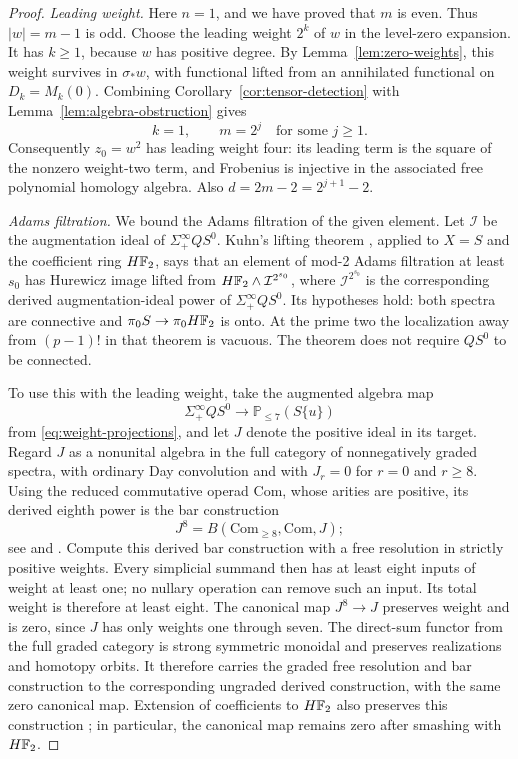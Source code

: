 \begin{proof}
\emph{Leading weight.}
Here \(n=1\), and we have proved that \(m\) is even. Thus
\(|w|=m-1\) is odd. Choose the leading weight \(2^k\) of \(w\)
in the level-zero expansion. It has \(k\ge1\), because \(w\) has
positive degree. By Lemma~\ref{lem:zero-weights}, this weight survives
in \(\sigma_*w\), with functional lifted from an annihilated
functional on \(D_k=M_k(0)\). Combining
Corollary~\ref{cor:tensor-detection} with
Lemma~\ref{lem:algebra-obstruction} gives
\[
k=1,\qquad m=2^j\quad\text{for some }j\ge1.
\]
Consequently \(z_0=w^2\) has leading weight four: its leading term
is the square of the nonzero weight-two term, and Frobenius is
injective in the associated free polynomial homology algebra. Also
\(d=2m-2=2^{j+1}-2\).

\emph{Adams filtration.}
We bound the Adams filtration of the given element.
Let \(\mathcal I\) be the augmentation ideal of
\(\Sigma^\infty_+QS^0\). Kuhn's lifting theorem
\cite[Theorems~1.2--1.3]{Kuhn2018}, applied to
\(X=S\) and the coefficient ring \(H\mathbb F_2\), says that an element
of mod-2 Adams filtration at least \(s_0\) has Hurewicz image lifted
from \(H\mathbb F_2\wedge\mathcal I^{2^{s_0}}\), where
\(\mathcal I^{2^{s_0}}\) is the corresponding derived augmentation-ideal power of
\(\Sigma^\infty_+QS^0\). Its hypotheses hold: both spectra are
connective and \(\pi_0S\to\pi_0H\mathbb F_2\) is onto. At the prime two
the localization away from \((p-1)!\) in that theorem is vacuous.
The theorem does not require \(QS^0\) to be connected.

To use this with the leading weight, take the augmented algebra map
\[
\Sigma^\infty_+QS^0\longrightarrow\mathbb P_{\le7}(S\{u\})
\]
from \eqref{eq:weight-projections}, and let \(J\) denote the
positive ideal in its target. Regard \(J\) as a nonunital algebra
in the full category of nonnegatively graded spectra, with ordinary
Day convolution and with \(J_r=0\) for \(r=0\) and \(r\ge8\).
Using the reduced commutative operad \(\mathrm{Com}\), whose arities
are positive, its derived eighth power is the bar construction
\[
J^8=B(\mathrm{Com}_{\ge8},\mathrm{Com},J);
\]
see \cite[Definition~2.7]{Kuhn2018} and
\cite[Definition~3.1 and Example~3.2]{KuhnPereira2017}. Compute this
derived bar construction with a free resolution in
strictly positive weights. Every simplicial summand then has at least
eight inputs of weight at least one; no nullary operation can remove
such an input.
Its total weight is therefore at least eight.
The canonical map \(J^8\to J\) preserves weight and is zero, since
\(J\) has only weights one through seven. The direct-sum functor
from the full graded category is strong symmetric monoidal and
preserves realizations and homotopy orbits. It therefore carries the
graded free resolution and bar construction to the corresponding
ungraded derived construction, with the same zero canonical map.
Extension of coefficients to \(H\mathbb F_2\) also preserves this
construction \cite[Theorem~3.4(d)]{KuhnPereira2017}; in particular,
the canonical map remains zero after smashing with \(H\mathbb F_2\).


\end{proof}
